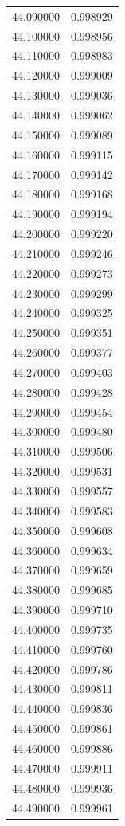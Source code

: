 \begin{tabular}{rr}
44.090000 & 0.998929 \\
44.100000 & 0.998956 \\
44.110000 & 0.998983 \\
44.120000 & 0.999009 \\
44.130000 & 0.999036 \\
44.140000 & 0.999062 \\
44.150000 & 0.999089 \\
44.160000 & 0.999115 \\
44.170000 & 0.999142 \\
44.180000 & 0.999168 \\
44.190000 & 0.999194 \\
44.200000 & 0.999220 \\
44.210000 & 0.999246 \\
44.220000 & 0.999273 \\
44.230000 & 0.999299 \\
44.240000 & 0.999325 \\
44.250000 & 0.999351 \\
44.260000 & 0.999377 \\
44.270000 & 0.999403 \\
44.280000 & 0.999428 \\
44.290000 & 0.999454 \\
44.300000 & 0.999480 \\
44.310000 & 0.999506 \\
44.320000 & 0.999531 \\
44.330000 & 0.999557 \\
44.340000 & 0.999583 \\
44.350000 & 0.999608 \\
44.360000 & 0.999634 \\
44.370000 & 0.999659 \\
44.380000 & 0.999685 \\
44.390000 & 0.999710 \\
44.400000 & 0.999735 \\
44.410000 & 0.999760 \\
44.420000 & 0.999786 \\
44.430000 & 0.999811 \\
44.440000 & 0.999836 \\
44.450000 & 0.999861 \\
44.460000 & 0.999886 \\
44.470000 & 0.999911 \\
44.480000 & 0.999936 \\
44.490000 & 0.999961 \\

\end{tabular}
